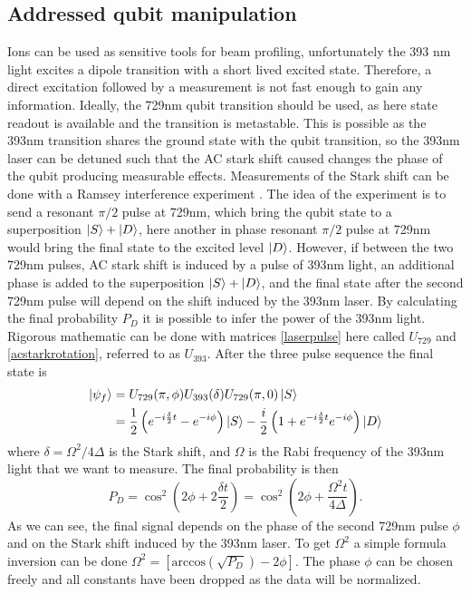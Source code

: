 \subsection{Addressed qubit manipulation}
Ions can be used as sensitive tools for beam profiling, unfortunately the 393 nm light excites a dipole transition with a short lived excited state. Therefore, a direct excitation followed by a measurement is not fast enough to gain any information. Ideally, the 729nm qubit transition should be used, as here state readout is available and the transition is metastable. This is possible as the 393nm transition shares the ground state with the qubit transition, so the 393nm laser can be detuned such that the AC stark shift caused changes the phase of the qubit producing measurable effects. Measurements of the Stark shift can be done with a Ramsey interference experiment \cite{starkshift}.
The idea of the experiment is to send a resonant $\pi/2$ pulse at 729nm, which bring the qubit state to a superposition $\ket{S}+\ket{D}$, here another in phase resonant $\pi/2$ pulse at 729nm would bring the final state to the excited level $\ket{D}$. However, if between the two 729nm pulses, AC stark shift is induced by a pulse of 393nm light, an additional phase is added to the superposition $\ket{S}+\ket{D}$, and the final state after the second 729nm pulse will depend on the shift induced by the 393nm laser. By calculating the final probability $P_D$ it is possible to infer the power of the 393nm light. Rigorous mathematic can be done with matrices \eqref{laserpulse} here called $U_{729}$ and \eqref{acstarkrotation}, referred to as $U_{393}$. After the three pulse sequence the final state is
\begin{equation}
\begin{split}
\ket{\psi_f} &= U_{729}(\pi,\phi)U_{393}(\delta)U_{729}(\pi,0)\ket{S} \\
&= \frac{1}{2}\left(e^{-i\frac{\delta}{2}t}-e^{-i\phi}\right)\ket{S}-\frac{i}{2}\left(1 + e^{-i\frac{\delta}{2}t} e^{-i\phi}\right)\ket{D}
\end{split}
\end{equation}
where $\delta = \Omega^2/4\Delta$ is the Stark shift, and $\Omega$ is the Rabi frequency of the 393nm light that we want to measure. The final probability is then
\begin{equation}
P_D = \cos^2\left(2\phi + 2\frac{\delta t}{2}\right) = \cos^2\left(2\phi + \frac{\Omega^2 t}{4\Delta}\right).
\end{equation}
As we can see, the final signal depends on the phase of the second 729nm pulse $\phi$ and on the Stark shift induced by the 393nm laser. To get $\Omega^2$ a simple formula inversion can be done $\Omega^2 = \left[\text{arccos}\left(\sqrt{P_D}\right)-2\phi \right]$. The phase $\phi$ can be chosen freely and all constants have been dropped as the data will be normalized.\\
